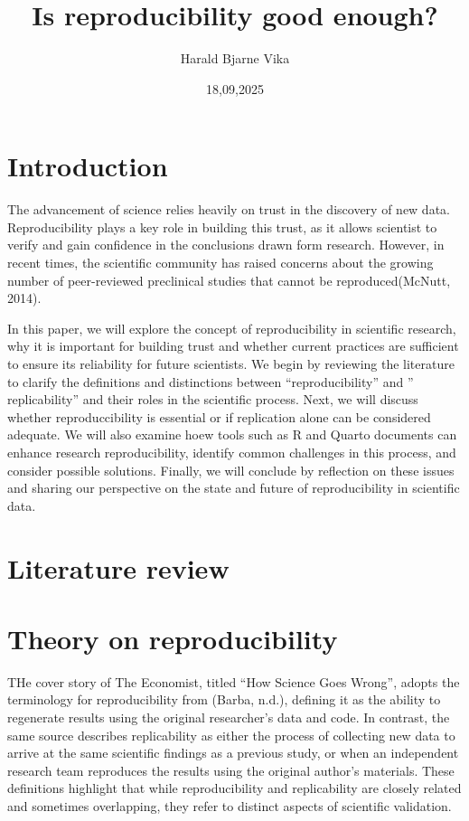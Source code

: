 \documentclass[
  british,
  a4paper,
]{article}
\title{Is reproducibility good enough?}
\author{Harald Bjarne Vika}
\date{18,09,2025}
\begin{document}
\maketitle


\section{Introduction}\label{introduction}

The advancement of science relies heavily on trust in the discovery of
new data. Reproducibility plays a key role in building this trust, as it
allows scientist to verify and gain confidence in the conclusions drawn
form research. However, in recent times, the scientific community has
raised concerns about the growing number of peer-reviewed preclinical
studies that cannot be reproduced(McNutt, 2014).

In this paper, we will explore the concept of reproducibility in
scientific research, why it is important for building trust and whether
current practices are sufficient to ensure its reliability for future
scientists. We begin by reviewing the literature to clarify the
definitions and distinctions between ``reproducibility'' and ''
replicability'' and their roles in the scientific process. Next, we will
discuss whether reproduccibility is essential or if replication alone
can be considered adequate. We will also examine hoew tools such as R
and Quarto documents can enhance research reproducibility, identify
common challenges in this process, and consider possible solutions.
Finally, we will conclude by reflection on these issues and sharing our
perspective on the state and future of reproducibility in scientific
data.

\section{Literature review}\label{literature-review}

\section{Theory on reproducibility}\label{theory-on-reproducibility}

THe cover story of The Economist, titled ``How Science Goes Wrong'',
adopts the terminology for reproducibility from (Barba, n.d.), defining
it as the ability to regenerate results using the original researcher's
data and code. In contrast, the same source describes replicability as
either the process of collecting new data to arrive at the same
scientific findings as a previous study, or when an independent research
team reproduces the results using the original author's materials. These
definitions highlight that while reproducibility and replicability are
closely related and sometimes overlapping, they refer to distinct
aspects of scientific validation.
\end{document}
